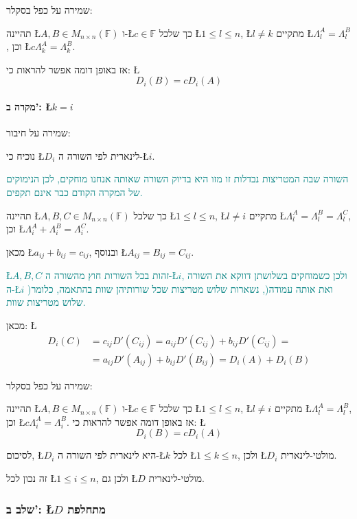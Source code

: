 \documentclass[english,hebrew]{article}
\begin{document}
שמירה על כפל בסקלר:

תהיינה \L{$A,B\in M_{n\times n}(\mathbb{F})$} ו-\L{$c\in\mathbb{F}$}
כך שלכל \L{$1\le l\le n$}, \L{$l\neq k$} מתקיים \L{$\Lambda_{l}^{A}=\Lambda_{l}^{B}$},
וכן \L{$c\Lambda_{k}^{A}=\Lambda_{k}^{B}$}.

אז באופן דומה אפשר להראות כי: \L{%
\[
D_{i}(B)=cD_{i}(A)
\]
}%

\paragraph*{מקרה ב': \L{$k=i$}}

שמירה על חיבור:

נוכיח כי \L{$D_{i}$} לינארית לפי השורה ה-\L{$i$}.

\textcolor{teal}{השורה שבה המטריצות נבדלות זו מזו היא בדיוק השורה
שאותה אנחנו מוחקים, לכן הנימוקים של המקרה הקודם כבר אינם תקפים.}

תהיינה \L{$A,B,C\in M_{n\times n}(\mathbb{F})$} כך שלכל \L{$1\le l\le n$},
\L{$l\neq i$} מתקיים \L{$\Lambda_{l}^{A}=\Lambda_{l}^{B}=\Lambda_{l}^{C}$},
וכן \L{$\Lambda_{i}^{A}+\Lambda_{i}^{B}=\Lambda_{i}^{C}$}.

מכאן \L{$a_{ij}+b_{ij}=c_{ij}$}, ובנוסף \L{$A_{ij}=B_{ij}=C_{ij}$}.

\textcolor{teal}{\L{$A,B,C$} זהות בכל השורות חוץ מהשורה ה-\L{$i$},
ולכן כשמוחקים בשלושתן דווקא את השורה ה-\L{$i$} )ואת אותה עמודה(,
נשארות שלוש מטריצות שכל שורותיהן שוות בהתאמה, כלומר שלוש מטריצות שוות.}

מכאן: \L{%
\begin{align*}
D_{i}(C) & =c_{ij}D'(C_{ij})=a_{ij}D'(C_{ij})+b_{ij}D'(C_{ij})=\\
 & =a_{ij}D'(A_{ij})+b_{ij}D'(B_{ij})=D_{i}(A)+D_{i}(B)
\end{align*}
}%

שמירה על כפל בסקלר:

תהיינה \L{$A,B\in M_{n\times n}(\mathbb{F})$} ו-\L{$c\in\mathbb{F}$}
כך שלכל \L{$1\le l\le n$}, \L{$l\neq i$} מתקיים \L{$\Lambda_{l}^{A}=\Lambda_{l}^{B}$},
וכן \L{$c\Lambda_{i}^{A}=\Lambda_{i}^{B}$}. אז באופן דומה אפשר להראות
כי: \L{%
\[
D_{i}(B)=cD_{i}(A)
\]
}%

לסיכום, \L{$D_{i}$} היא לינארית לפי השורה ה-\L{$k$} לכל \L{$1\le k\le n$},
ולכן \L{$D_{i}$} מולטי-לינארית.

זה נכון לכל \L{$1\le i\le n$}, ולכן גם \L{$D$} מולטי-לינארית.

\subsubsection{שלב ב': \L{$D$} מתחלפת}
\end{document}

